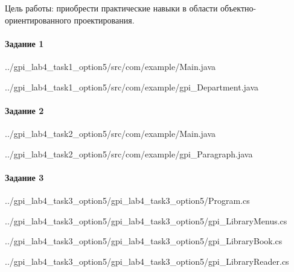 Цель работы:
приобрести практические навыки в области объектно-ориентированного проектирования.


\paragraph{Задание 1} \hspace{0pt}


{../gpi_lab4_task1_option5/src/com/example/Main.java}


{../gpi_lab4_task1_option5/src/com/example/gpi_Department.java}



\paragraph{Задание 2} \hspace{0pt}


{../gpi_lab4_task2_option5/src/com/example/Main.java}


{../gpi_lab4_task2_option5/src/com/example/gpi_Paragraph.java}



\paragraph{Задание 3} \hspace{0pt}


{../gpi_lab4_task3_option5/gpi_lab4_task3_option5/Program.cs}


{../gpi_lab4_task3_option5/gpi_lab4_task3_option5/gpi_LibraryMenus.cs}


{../gpi_lab4_task3_option5/gpi_lab4_task3_option5/gpi_LibraryBook.cs}


{../gpi_lab4_task3_option5/gpi_lab4_task3_option5/gpi_LibraryReader.cs}

\newpage
